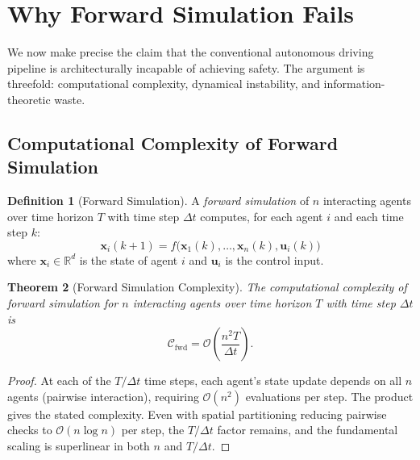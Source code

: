 \documentclass[twocolumn,10pt]{article}
\newtheorem{theorem}{Theorem}[section]
\theoremstyle{definition}
\newtheorem{definition}[theorem]{Definition}
\newcommand{\BigO}{\mathcal{O}}
\begin{document}
\section{Why Forward Simulation Fails}
\label{sec:forward-fails}

We now make precise the claim that the conventional autonomous driving pipeline is architecturally incapable of achieving safety. The argument is threefold: computational complexity, dynamical instability, and information-theoretic waste.

\subsection{Computational Complexity of Forward Simulation}

\begin{definition}[Forward Simulation]
\label{def:forward-sim}
A \emph{forward simulation} of $n$ interacting agents over time horizon $T$ with time step $\Delta t$ computes, for each agent $i$ and each time step $k$:
\begin{equation}
\mathbf{x}_i(k+1) = f\bigl(\mathbf{x}_1(k), \ldots, \mathbf{x}_n(k), \mathbf{u}_i(k)\bigr)
\end{equation}
where $\mathbf{x}_i \in \mathbb{R}^d$ is the state of agent $i$ and $\mathbf{u}_i$ is the control input.
\end{definition}

\begin{theorem}[Forward Simulation Complexity]
\label{thm:forward-complexity}
The computational complexity of forward simulation for $n$ interacting agents over time horizon $T$ with time step $\Delta t$ is
\begin{equation}
\mathcal{C}_{\mathrm{fwd}} = \BigO\!\left(\frac{n^2 T}{\Delta t}\right).
\end{equation}
\end{theorem}

\begin{proof}
At each of the $T/\Delta t$ time steps, each agent's state update depends on all $n$ agents (pairwise interaction), requiring $\BigO(n^2)$ evaluations per step. The product gives the stated complexity. Even with spatial partitioning reducing pairwise checks to $\BigO(n \log n)$ per step, the $T/\Delta t$ factor remains, and the fundamental scaling is superlinear in both $n$ and $T/\Delta t$.
\end{proof}
\end{document}
